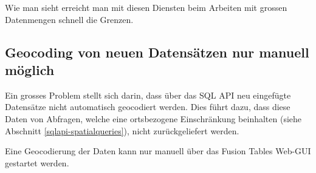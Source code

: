 Wie man sieht erreicht man mit diesen Diensten beim Arbeiten mit grossen Datenmengen schnell die Grenzen.

\subsection{Geocoding von neuen Datensätzen nur manuell möglich}
\label{geocodierung-bug}
Ein grosses Problem stellt sich darin, dass über das SQL API neu eingefügte Datensätze nicht automatisch geocodiert werden. Dies führt dazu, dass diese Daten von Abfragen, welche eine ortsbezogene Einschränkung beinhalten (siehe Abschnitt \ref{sqlapi-spatialqueries}), nicht zurückgeliefert werden.

Eine Geocodierung der Daten kann nur manuell über das Fusion Tables Web-GUI gestartet werden.
